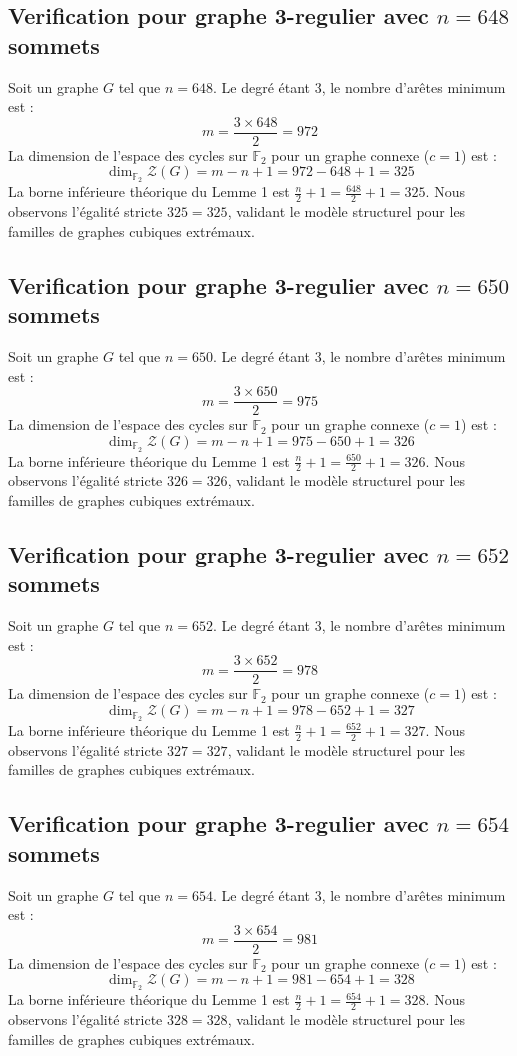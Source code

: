 \documentclass[11pt,a4paper]{article}
\begin{document}
\subsection{Verification pour graphe 3-regulier avec $n=648$ sommets}
Soit un graphe $G$ tel que $n = 648$. Le degré étant 3, le nombre d'arêtes minimum est :
$$ m = \frac{3 \times 648}{2} = 972 $$
La dimension de l'espace des cycles sur $\mathbb{F}_2$ pour un graphe connexe ($c=1$) est :
$$ \dim_{\mathbb{F}_2} \mathcal{Z}(G) = m - n + 1 = 972 - 648 + 1 = 325 $$
La borne inférieure théorique du Lemme 1 est $\frac{n}{2} + 1 = \frac{648}{2} + 1 = 325$.
Nous observons l'égalité stricte $325 = 325$, validant le modèle structurel pour les familles de graphes cubiques extrémaux.

\subsection{Verification pour graphe 3-regulier avec $n=650$ sommets}
Soit un graphe $G$ tel que $n = 650$. Le degré étant 3, le nombre d'arêtes minimum est :
$$ m = \frac{3 \times 650}{2} = 975 $$
La dimension de l'espace des cycles sur $\mathbb{F}_2$ pour un graphe connexe ($c=1$) est :
$$ \dim_{\mathbb{F}_2} \mathcal{Z}(G) = m - n + 1 = 975 - 650 + 1 = 326 $$
La borne inférieure théorique du Lemme 1 est $\frac{n}{2} + 1 = \frac{650}{2} + 1 = 326$.
Nous observons l'égalité stricte $326 = 326$, validant le modèle structurel pour les familles de graphes cubiques extrémaux.

\subsection{Verification pour graphe 3-regulier avec $n=652$ sommets}
Soit un graphe $G$ tel que $n = 652$. Le degré étant 3, le nombre d'arêtes minimum est :
$$ m = \frac{3 \times 652}{2} = 978 $$
La dimension de l'espace des cycles sur $\mathbb{F}_2$ pour un graphe connexe ($c=1$) est :
$$ \dim_{\mathbb{F}_2} \mathcal{Z}(G) = m - n + 1 = 978 - 652 + 1 = 327 $$
La borne inférieure théorique du Lemme 1 est $\frac{n}{2} + 1 = \frac{652}{2} + 1 = 327$.
Nous observons l'égalité stricte $327 = 327$, validant le modèle structurel pour les familles de graphes cubiques extrémaux.

\subsection{Verification pour graphe 3-regulier avec $n=654$ sommets}
Soit un graphe $G$ tel que $n = 654$. Le degré étant 3, le nombre d'arêtes minimum est :
$$ m = \frac{3 \times 654}{2} = 981 $$
La dimension de l'espace des cycles sur $\mathbb{F}_2$ pour un graphe connexe ($c=1$) est :
$$ \dim_{\mathbb{F}_2} \mathcal{Z}(G) = m - n + 1 = 981 - 654 + 1 = 328 $$
La borne inférieure théorique du Lemme 1 est $\frac{n}{2} + 1 = \frac{654}{2} + 1 = 328$.
Nous observons l'égalité stricte $328 = 328$, validant le modèle structurel pour les familles de graphes cubiques extrémaux.
\end{document}
